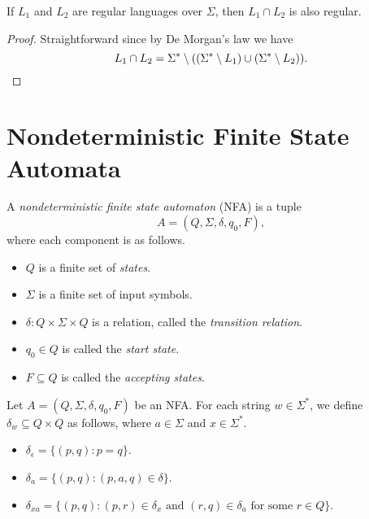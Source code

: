 \begin{corollary}
  If $L_1$ and $L_2$ are regular languages over $\Sigma$, then $L_1 \cap L_2$
  is also regular.
\end{corollary}
\begin{proof}
  Straightforward since by De Morgan's law we have
  \begin{equation*}
    L_1 \cap L_2
    = \Sigma^* \setminus
    ((\Sigma^* \setminus L_1) \cup (\Sigma^* \setminus L_2)).
    \qedhere
  \end{equation*}
\end{proof}

\section{Nondeterministic Finite State Automata}
\begin{definition}
  \label{def:nfa}
  A \emph{nondeterministic finite state automaton} (NFA) is a tuple
  \begin{equation*}
    A = (Q, \Sigma, \delta, q_0, F),
  \end{equation*}
  where each component is as follows.
  \begin{itemize}
    \item $Q$ is a finite set of \emph{states}.
    \item $\Sigma$ is a finite set of input symbols.
    \item $\delta: Q \times \Sigma \times Q$ is a relation, called the
    \emph{transition relation}.
    \item $q_0 \in Q$ is called the \emph{start state}.
    \item $F \subseteq Q$ is called the \emph{accepting states}.
  \end{itemize}
\end{definition}

\begin{definition}
  Let $A = (Q, \Sigma, \delta, q_0, F)$ be an NFA.
  For each string $w \in \Sigma^*$, we define $\delta_w \subseteq Q \times Q$
  as follows, where $a \in \Sigma$ and $x \in \Sigma^*$.
  \begin{itemize}
    \item $\delta_\epsilon = \{(p, q): p = q\}$.
    \item $\delta_a = \{(p, q): (p, a, q) \in \delta\}$.
    \item $\delta_{xa} = \{(p, q): \text{$(p, r) \in \delta_x$ and
    $(r, q) \in \delta_a$ for some $r \in Q$}\}$.
  \end{itemize}
\end{definition}

